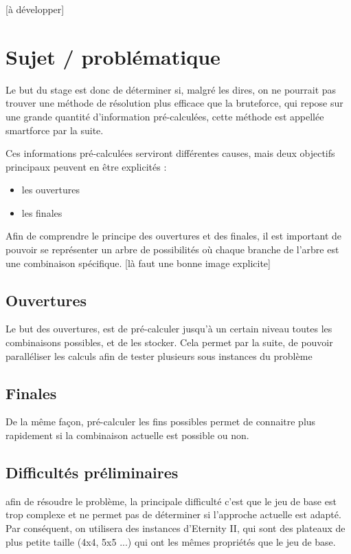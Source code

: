\documentclass{article}
\begin{document}
	[à développer]
	
	\section{Sujet / problématique}
	
	Le but du stage est donc de déterminer si, malgré les dires, on ne pourrait pas trouver une méthode de résolution plus efficace que la bruteforce, qui repose sur une grande quantité d'information pré-calculées, cette méthode est appellée smartforce par la suite.
	
	Ces informations pré-calculées serviront différentes causes, mais deux objectifs principaux peuvent en être explicités :
	
	\begin{itemize}
		\item les ouvertures
		\item les finales
	\end{itemize}
	
	Afin de comprendre le principe des ouvertures et des finales, il est important de pouvoir se représenter un arbre de possibilités où chaque branche de l'arbre est une combinaison spécifique. [là faut une bonne image explicite]
	
	\subsection{Ouvertures}
	
	Le but des ouvertures, est de pré-calculer jusqu'à un certain niveau toutes les combinaisons possibles, et de les stocker. Cela permet par la suite, de pouvoir paralléliser les calculs afin de tester plusieurs sous instances du problème
	
	\subsection{Finales}
	
	De la même façon, pré-calculer les fins possibles permet de connaitre plus rapidement si la combinaison actuelle est possible ou non.
	
	
	\subsection{Difficultés préliminaires}
	
	afin de résoudre le problème, la principale difficulté c'est que le jeu de base est trop complexe et ne permet pas de déterminer si l'approche actuelle est adapté. Par conséquent, on utilisera des instances d'Eternity II, qui sont des plateaux de plus petite taille (4x4, 5x5 ...) qui ont les mêmes propriétés que le jeu de base.
	
\end{document}
